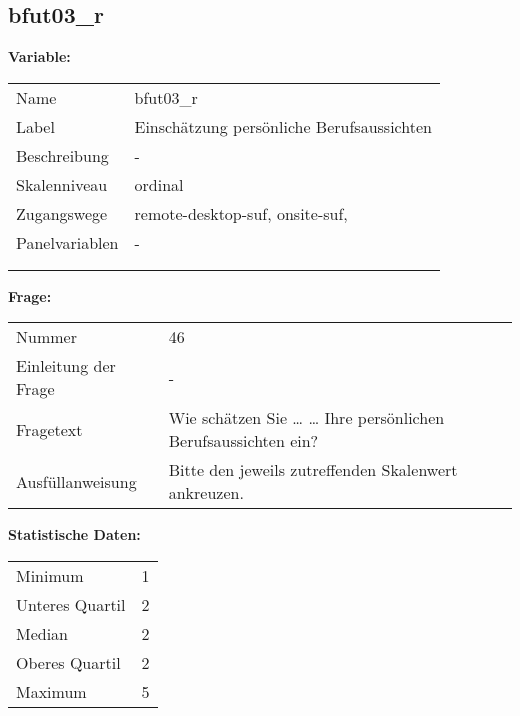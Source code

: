 	
	
	\subsection{bfut03\_r}
	\label{subSection:bfut03_r}

	\noindent\textbf{Variable:}\\
		\begin{tabular}{lL{11.3cm}}
			\label{tableVariable:bfut03_r}
			Name & bfut03\_r \\
			Label & Einschätzung persönliche Berufsaussichten \\
			Beschreibung & - \\
			Skalenniveau & ordinal \\
			Zugangswege &
				remote-desktop-suf,
				onsite-suf,
 \\
			Panelvariablen & -
			 \\
			 \\
 \\
		\end{tabular}

		\vspace*{1 cm}
		\noindent\textbf{Frage:}\\
		\begin{tabular}{lL{11.3cm}}
			\label{tableQuestion:bfut03_r}
			Nummer & 46 \\
			Einleitung der Frage & - \\
			Fragetext & Wie schätzen Sie …
… Ihre persönlichen Berufsaussichten ein? \\
			Ausfüllanweisung & Bitte den jeweils zutreffenden Skalenwert ankreuzen. \\
		\end{tabular}


		\vspace*{1 cm}
		\noindent\textbf{Statistische Daten:}\\
			\begin{tabular}{ll}
				\label{tableStatistics:bfut03_r}
					Minimum & 1 \\
					Unteres Quartil & 2 \\
					Median & 2 \\
					Oberes Quartil & 2 \\
					Maximum & 5 \\
			\end{tabular}



